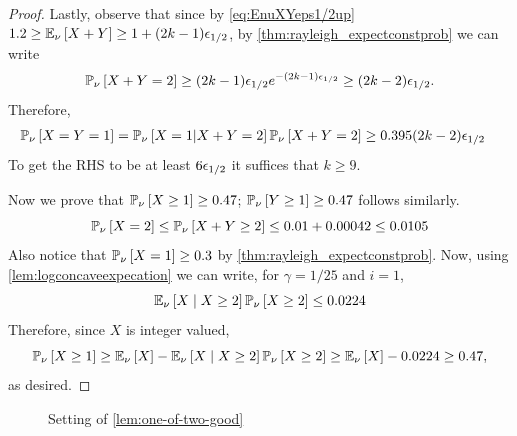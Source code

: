 \begin{proof}
Lastly, observe that since by \cref{eq:EnuXYeps1/2up} $1.2 \ge {\mathbb{E}}_{\nu}\left[X+Y\right]\geq 1+(2k-1){\epsilon}_{1/2}$, by  \cref{thm:rayleigh_expectconstprob} we can write
$${\mathbb{P}}_{\nu}\left[X+Y=2\right] \geq (2k-1){\epsilon}_{1/2} e^{-(2k-1){\epsilon}_{1/2}} \geq (2k-2){\epsilon}_{1/2}.$$ 
Therefore,
\begin{align*}
{\mathbb{P}}_{\nu}\left[X=Y=1\right] &= {\mathbb{P}}_{\nu}\left[X=1 | X+Y=2\right]{\mathbb{P}}_{\nu}\left[X+Y=2\right] \ge 0.395 (2k-2){\epsilon}_{1/2}
\end{align*}
To get the RHS to be at least $6{\epsilon}_{1/2}$ it suffices that $k\geq 9$.


Now we prove that ${\mathbb{P}}_{\nu}\left[X \ge 1\right] \ge 0.47$; ${\mathbb{P}}_{\nu}\left[Y \ge 1\right] \ge 0.47$ follows similarly.
$${\mathbb{P}}_{\nu}\left[X = 2\right] \le {\mathbb{P}}_{\nu}\left[X+Y \ge 2\right] \le 0.01 + 0.00042 \le 0.0105$$
Also notice that ${\mathbb{P}}_{\nu}\left[X = 1\right] \ge 0.3$ by \cref{thm:rayleigh_expectconstprob}.
Now, using \cref{lem:logconcaveexpecation} we can write, for $\gamma = 1/25$ and $i=1$,
$${\mathbb{E}}_{\nu}\left[X \mid X \ge 2\right]{\mathbb{P}}_{\nu}\left[X \ge 2\right] \le 0.0224$$ 
Therefore, since $X$ is integer valued,
$${\mathbb{P}}_{\nu}\left[X \ge 1\right] \ge {\mathbb{E}}_{\nu}\left[X\right] - {\mathbb{E}}_{\nu}\left[X \mid X \ge 2\right]{\mathbb{P}}_{\nu}\left[X \ge 2\right] \ge {\mathbb{E}}_{\nu}\left[X\right] - 0.0224 \ge 0.47,$$
as desired.
\end{proof}




\begin{figure}\centering
{}
\caption{Setting of \cref{lem:one-of-two-good}} 
\label{fig:incident_halfedges}
\end{figure}

